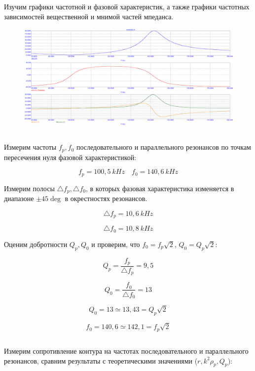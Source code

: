 \documentclass{article}
\begin{document}
Изучим графики частотной и фазовой характеристик, а также графики частотных зависимостей вещественной и мнимой частей мпеданса.

\begin{figure}[H]
\centering
\includegraphics[scale=0.4]{combined_AC1.png}
\label{fig:Image1}
\end{figure}

\subsection{} Измерим частоты $f_p, f_0$ последовательного и параллельного резонансов по точкам пересечения нуля фазовой характеристикой:

\[f_p = 100,5 \: kHz \quad f_0 = 140,6 \: kHz\]

Измерим полосы $\triangle f_p, \triangle f_0$, в которых фазовая характеристика изменяется в диапазоне $\pm 45 \deg$ в окрестностях резонансов.

\[\triangle f_p = 10,6 \: kHz\]

\[\triangle f_0 = 10,8 \: kHz\]

Оценим добротности $Q_p, Q_0$ и проверим, что $f_0 = f_p \sqrt{2}$, $Q_0 = Q_p \sqrt{2}$:

\[Q_p = \frac{f_p}{\triangle f_p} = 9,5\]

\[Q_0 = \frac{f_0}{\triangle f_0} = 13\]

\[Q_0 = 13 \simeq 13,43 = Q_p \sqrt{2}\]

\[f_0 = 140,6 \simeq 142,1 = f_p \sqrt{2}\]

\subsection{} Измерим сопротивление контура на частотах последовательного и параллельного резонансов, сравним результаты с теоретическими значениями ($r, k^2\rho_p, Q_p$):
\end{document}
